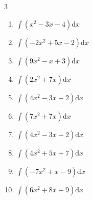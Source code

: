 \begin{multicols}{3}
\begin{enumerate}
  \item $\displaystyle \int \left( x^{2}-3x-4 \right) \mathrm{d}x$


\columnbreak %

  \item $\displaystyle \int \left( -2x^{2}+5x-2 \right) \mathrm{d}x$


  \item $\displaystyle \int \left( 9x^{2}-x+3 \right) \mathrm{d}x$


  \item $\displaystyle \int \left( 2x^{2}+7x \right) \mathrm{d}x$


  \item $\displaystyle \int \left( 4x^{2}-3x-2 \right) \mathrm{d}x$


  \item $\displaystyle \int \left( 7x^{2}+7x \right) \mathrm{d}x$


  \item $\displaystyle \int \left( 4x^{2}-3x+2 \right) \mathrm{d}x$


  \item $\displaystyle \int \left( 4x^{2}+5x+7 \right) \mathrm{d}x$


  \item $\displaystyle \int \left( -7x^{2}+x-9 \right) \mathrm{d}x$


  \item $\displaystyle \int \left( 6x^{2}+8x+9 \right) \mathrm{d}x$



\end{enumerate}
\end{multicols}
